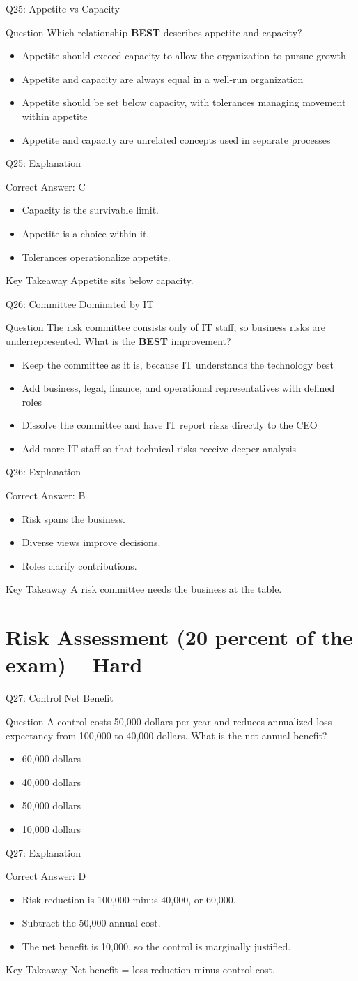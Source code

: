 \documentclass[aspectratio=169]{beamer}
\newcommand{\hq}[7]{%
	\begin{frame}{Q#1: #2}
		\begin{block}{Question}
			#3
		\end{block}
		\begin{itemize}
			#4
		\end{itemize}
	\end{frame}
	\begin{frame}{Q#1: Explanation}
		\begin{block}{Correct Answer: #5}
			\begin{itemize}
				#6
			\end{itemize}
		\end{block}
		\begin{alertblock}{Key Takeaway}
			#7
		\end{alertblock}
	\end{frame}
}
\begin{document}
	\hq{25}{Appetite vs Capacity}
	{Which relationship \textbf{BEST} describes appetite and capacity?}
	{\item[\textbf{(A)}] Appetite should exceed capacity to allow the organization to pursue growth
		\item[\textbf{(B)}] Appetite and capacity are always equal in a well-run organization
		\item[\textbf{(C)}] Appetite should be set below capacity, with tolerances managing movement within appetite
		\item[\textbf{(D)}] Appetite and capacity are unrelated concepts used in separate processes}
	{C}
	{\item Capacity is the survivable limit.
		\item Appetite is a choice within it.
		\item Tolerances operationalize appetite.}
	{Appetite sits below capacity.}

	\hq{26}{Committee Dominated by IT}
	{The risk committee consists only of IT staff, so business risks are underrepresented. What is the \textbf{BEST} improvement?}
	{\item[\textbf{(A)}] Keep the committee as it is, because IT understands the technology best
		\item[\textbf{(B)}] Add business, legal, finance, and operational representatives with defined roles
		\item[\textbf{(C)}] Dissolve the committee and have IT report risks directly to the CEO
		\item[\textbf{(D)}] Add more IT staff so that technical risks receive deeper analysis}
	{B}
	{\item Risk spans the business.
		\item Diverse views improve decisions.
		\item Roles clarify contributions.}
	{A risk committee needs the business at the table.}

	\section{Risk Assessment (20 percent of the exam) -- Hard}

	\hq{27}{Control Net Benefit}
	{A control costs 50,000 dollars per year and reduces annualized loss expectancy from 100,000 to 40,000 dollars. What is the net annual benefit?}
	{\item[\textbf{(A)}] 60,000 dollars
		\item[\textbf{(B)}] 40,000 dollars
		\item[\textbf{(C)}] 50,000 dollars
		\item[\textbf{(D)}] 10,000 dollars}
	{D}
	{\item Risk reduction is 100,000 minus 40,000, or 60,000.
		\item Subtract the 50,000 annual cost.
		\item The net benefit is 10,000, so the control is marginally justified.}
	{Net benefit = loss reduction minus control cost.}
\end{document}
